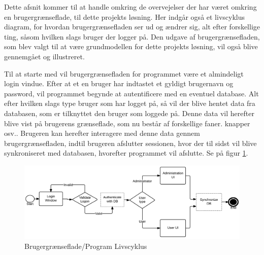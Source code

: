 Dette afsnit kommer til at handle omkring de overvejelser der har været omkring en brugergrænseflade, til dette projekts løsning. Her indgår også et livscyklus diagram, for hvordan brugergrænsefladen ser ud og ændrer sig, alt efter forskellige ting, såsom hvilken slags bruger der logger på. Den udgave af brugergrænsefladen, som blev valgt til at være grundmodellen for dette projekts løsning, vil også blive gennemgået og illustreret.

Til at starte med vil brugergrænsefladen for programmet være et almindeligt login vindue. Efter at et en bruger har indtastet et gyldigt brugernavn og password, vil programmet begynde at autentificere med en eventuel database. Alt efter hvilken slags type bruger som har logget på, så vil der blive hentet data fra databasen, som er tilknyttet den bruger som loggede på. Denne data vil herefter blive vist på brugerens grænseflade, som nu består af forskellige faner. knapper osv.. Brugeren kan herefter interagere med denne data gennem brugergrænsefladen, indtil brugeren afslutter sessionen, hvor der til sidst vil blive synkroniseret med databasen, hvorefter programmet vil afslutte. Se på figur \ref{LifeCycle}.

\begin{figure}[H]
\centering
\includegraphics[width=1\textwidth]{Billeder/LifeCycle.png}
\caption{Brugergrænseflade/Program Livscyklus}
\label{LifeCycle}
\end{figure}